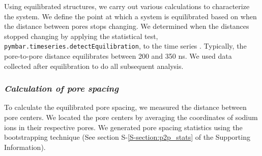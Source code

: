 \documentclass[journal=jpcbfk,manusciprt=article]{achemso}
\begin{document}
  Using equilibrated structures, we carry out various calculations to
  characterize the system. We define the point at which a system is equilibrated
  based on when the distance between pores stops changing.  We determined when
  the distances stopped changing by applying the statistical test,
  \texttt{pymbar.timeseries.detectEquilibration}, to the time series
  \cite{chodera_simple_2016,shirts_statistically_2008}. Typically, the pore-to-pore
  distance equilibrates between 200 and 350 ns. We used data collected after 
  equilibration to do all subsequent analysis.

  \subsubsection{\textit{Calculation of pore spacing}}\label{method:pore_spacing}

  To calculate the equilibrated pore spacing, we measured the distance between
  pore centers. We located the pore centers by averaging the coordinates of sodium
  ions in their respective pores. We generated pore spacing statistics 
  using the bootstrapping technique (See section S-\ref{S-section:p2p_stats} of the
  Supporting Information).

%
  
\end{document}
